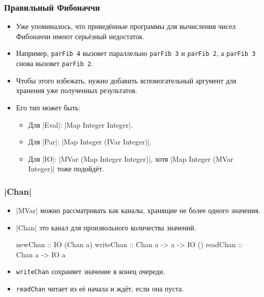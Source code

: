 \documentclass[11pt]{beamer}
\begin{document}
\begin{frame}[fragile]
\frametitle{Правильный Фибоначчи}
\begin{itemize}
    \item Уже упоминалось, что приведённые программы для вычисления чисел Фибоначчи имеют серьёзный недостаток.
    \item Например, \lstinline|parFib 4| вызовет параллельно \lstinline|parFib 3| и \lstinline|parFib 2|, а \lstinline|parFib 3| снова вызовет \lstinline|parFib 2|.
    \item Чтобы этого избежать, нужно добавить вспомогательный аргумент для хранения уже полученных результатов.
    \item Его тип может быть:
    \begin{itemize}
        \item Для \haskinline|Eval|: \haskinline|Map Integer Integer|.
        \item Для \haskinline|Par|: \haskinline|Map Integer (IVar Integer)|.
        \item Для \haskinline|IO|: \haskinline|MVar (Map Integer Integer)|, хотя \haskinline|Map Integer (MVar Integer)| тоже подойдёт.
    \end{itemize}
\end{itemize}
\end{frame}

\begin{frame}[fragile]
\frametitle{\haskinline|Chan|}
\begin{itemize}
    \item \haskinline|MVar| можно рассматривать как каналы, хранящие не более одного значения.
    \item \haskinline|Chan| это канал для произвольного количества значений.
    \begin{haskell}
        newChan :: IO (Chan a)
        writeChan :: Chan a -> a -> IO () 
        readChan :: Chan a -> IO a
    \end{haskell}
    \item \lstinline|writeChan| сохраняет значение в конец очереди.
    \item \lstinline|readChan| читает из её начала и ждёт, если она пуста.
\end{itemize}
\end{frame}
\end{document}
